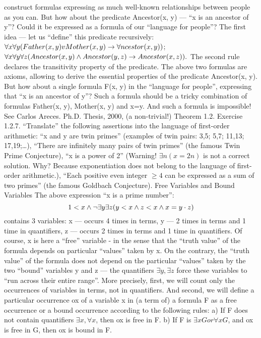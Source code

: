 construct formulas expressing as much well-known relationships between people as you can.
But how about the predicate Ancestor(x, y) --- ``x is an ancestor of y''? Could it be expressed as a formula
of our ``language for people''? The first idea --- let us ``define'' this predicate recursively:
\(\forall x\forall y(Father(x, y) v Mother(x, y)\rightarrow \forall ncestor(x, y))\);
\(\forall x\forall y\forall z(Ancestor(x, y) \wedge  Ancestor(y, z)\rightarrow Ancestor(x, z)).\)
The second rule declares the transitivity property of the predicate. The above two formulas are axioms,
allowing to derive the essential properties of the predicate Ancestor(x, y). But how about a single formula
F(x, y) in the ``language for people'', expressing that ``x is an ancestor of y''? Such a formula should be a
tricky combination of formulas Father(x, y), Mother(x, y) and x=y. And such a formula is impossible! See
Carlos Areces. Ph.D. Thesis, 2000, (a non-trivial!) Theorem 1.2.
Exercise 1.2.7. ``Translate'' the following assertions into the language of first-order arithmetic:
``x and y are twin primes'' (examples of twin pairs: 3,5; 5,7; 11,13; 17,19;\ldots ),
``There are infinitely many pairs of twin primes'' (the famous Twin Prime Conjecture),
``x is a power of 2'' (Warning! \(\exists n(x=2n)\) is not a correct solution. Why? Because exponentiation does not
belong to the language of first-order arithmetic.),
``Each positive even integer \(\geq4\) can be expressed as a sum of two primes''
(the famous Goldbach Conjecture).
Free Variables and Bound Variables
The above expression ``x is a prime number'':
\[1<x \wedge  \neg \exists y\exists z(y<x \wedge  z<x \wedge  x=y\cdot z)\]
contains 3 variables: x --- occurs 4 times in terms, y --- 2 times in terms and 1 time in quantifiers, z --- occurs
2 times in terms and 1 time in quantifiers. Of course, x is here a ``free'' variable - in the sense that the
``truth value'' of the formula depends on particular ``values'' taken by x. On the contrary, the ``truth value''
of the formula does not depend on the particular ``values'' taken by the two ``bound'' variables y and z ---
the quantifiers \(\exists y, \exists z\) force these variables to ``run across their entire range''.
More precisely, first, we will count only the occurrences of variables in terms, not in quantifiers. And
second, we will define a particular occurrence ox of a variable x in (a term of) a formula F as a free
occurrence or a bound occurrence according to the following rules:
a) If F does not contain quantifiers \(\exists x, \forall x\), then ox is free in F.
b) If F is \(\exists xG or \forall xG\), and ox is free in G, then ox is bound in F.
